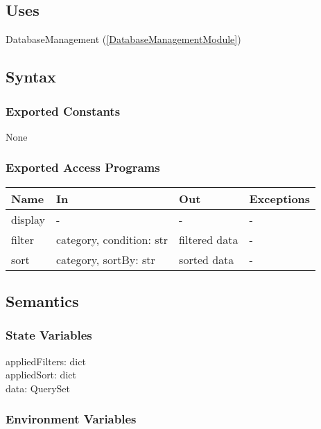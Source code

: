 \documentclass[12pt, titlepage]{article}
\begin{document}
\subsection{Uses}

DatabaseManagement (\ref{DatabaseManagementModule})

\subsection{Syntax}

\subsubsection{Exported Constants}

None

\subsubsection{Exported Access Programs}

\begin{center}
\begin{tabular}{p{2cm} p{4cm} p{4cm} p{2cm}}
\hline
\textbf{Name} & \textbf{In} & \textbf{Out} & \textbf{Exceptions} \\
\hline
display & - & - & - \\
filter & category, condition: str & filtered data & - \\
sort & category, sortBy: str & sorted data & - \\
\hline
\end{tabular}
\end{center}

\subsection{Semantics}

\subsubsection{State Variables}

appliedFilters: dict \\
appliedSort: dict \\
data: QuerySet

\subsubsection{Environment Variables}
\end{document}
